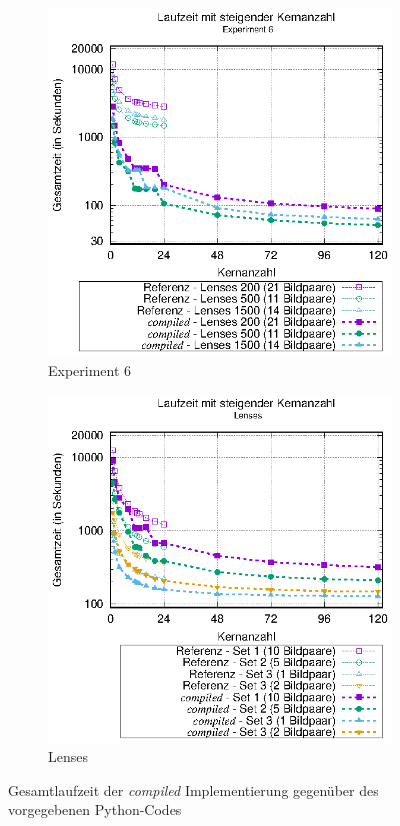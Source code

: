 \begin{center}
	\begin{figure}[htbp]
		\begin{subfigure}[b]{0.45\textwidth}
			\centering
			\includegraphics[width=\textwidth]{pdf/best_times_exp6}
			\caption{Experiment 6}
			\label{fig:best_times_exp6}
		\end{subfigure}
		\hfill
		\begin{subfigure}[b]{0.45\textwidth}
			\centering
			\includegraphics[width=\textwidth]{pdf/best_times_lenses}
			\caption{Lenses}
			\label{fig:best_times_lenses}
		\end{subfigure}
		\caption{Gesamtlaufzeit der \textit{compiled} Implementierung gegenüber des vorgegebenen Python-Codes}
		\label{fig:best_times}
	\end{figure}
\end{center}

